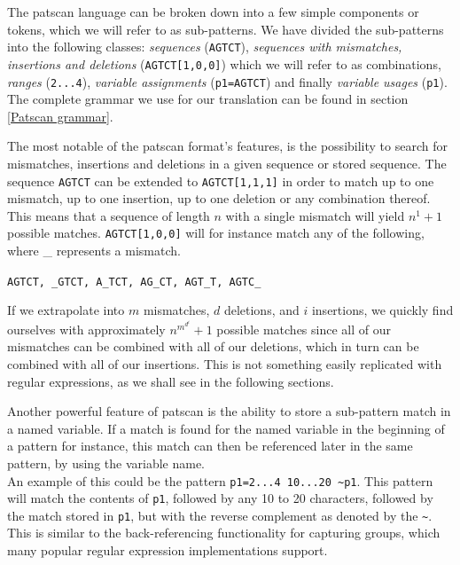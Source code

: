 \documentclass[12pt]{article}
\begin{document}
The patscan language can be broken down into a few simple components or tokens, which we will refer to as sub-patterns. We have divided the sub-patterns into the following classes: \textit{sequences} (\texttt{AGTCT}), \textit{sequences with mismatches, insertions and deletions} (\texttt{AGTCT[1,0,0]}) which we will refer to as combinations, \textit{ranges} (\texttt{2...4}), \textit{variable assignments} (\texttt{p1=AGTCT}) and finally \textit{variable usages} (\texttt{p1}). The complete grammar we use for our translation can be found in section \ref{Patscan grammar}.

The most notable of the patscan format's features, is the possibility to search for mismatches, insertions and deletions in a given sequence or stored sequence. The sequence \texttt{AGTCT} can be extended to \texttt{AGTCT[1,1,1]} in order to match up to one mismatch, up to one insertion, up to one deletion or any combination thereof. \\
This means that a sequence of length $n$ with a single mismatch will yield $n^1+1$ possible matches. \texttt{AGTCT[1,0,0]} will for instance match any of the following, where \_ represents a mismatch.

\texttt{AGTCT, \_GTCT, A\_TCT, AG\_CT, AGT\_T, AGTC\_}

If we extrapolate into $m$ mismatches, $d$ deletions, and $i$ insertions, we quickly find ourselves with approximately $n^{m^{d^{i}}}+1$ possible matches since all of our mismatches can be combined with all of our deletions, which in turn can be combined with all of our insertions. This is not something easily replicated with regular expressions, as we shall see in the following sections.

Another powerful feature of patscan is the ability to store a sub-pattern match in a named variable. If a match is found for the named variable in the beginning of a pattern for instance, this match can then be referenced later in the same pattern, by using the variable name. \\
An example of this could be the pattern \texttt{p1=2...4 10...20 \~{}p1}. This pattern will match the contents of \texttt{p1}, followed by any 10 to 20 characters, followed by the match stored in \texttt{p1}, but with the reverse complement as denoted by the \texttt{\~{}}.\\
This is similar to the back-referencing functionality for capturing groups, which many popular regular expression implementations support.%
\end{document}
